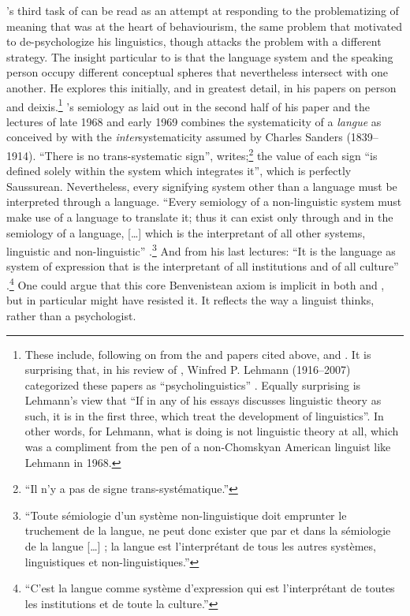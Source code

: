 \documentclass[output=paper]{langscibook}
\begin{document}
{\Benveniste}'s third task of \citeyear{Benveniste1954} can be read as an attempt at responding to the problematizing of meaning that was at the heart of behaviourism, the same problem that motivated {\Bloomfield} to de-psychologize his linguistics, though {\Benveniste} attacks the problem with a different strategy. The insight particular to {\Benveniste} is that the language system and the speaking person occupy different conceptual spheres that nevertheless intersect with one another. He explores this initially, and in greatest detail, in his papers on person and deixis.\footnote{These include, following on from the \citeyear{Benveniste1946} and \citeyear{Benveniste1949} papers cited above, \citet{Benveniste1956nature} and \citet{Benveniste1958}. It is surprising that, in his review of \citet{Benveniste1966}, Winfred P. Lehmann (1916--2007) categorized these papers as ``psycholinguistics'' \citep{Lehmann1968}. Equally surprising is Lehmann's view that ``If in any of his essays {\Benveniste} discusses linguistic theory as such, it is in the first three, which treat the development of linguistics''. In other words, for Lehmann, what {\Benveniste} is doing is not linguistic theory at all, which was a compliment from the pen of a non-Chomskyan American linguist like Lehmann in 1968.} {\Benveniste}'s semiology as laid out in the second half of his \citeyear{Benveniste1969semiologie} paper and the lectures of late 1968 and early 1969 combines the systematicity of a \emph{langue} as conceived by {\Saussure} with the \emph{inter}systematicity assumed by Charles Sanders {\Peirce} (1839--1914). ``There is no trans-systematic sign'', \citet[53]{Benveniste1969semiologie} writes;\footnote{``Il n'y a pas de signe trans-systématique.''} the value of each sign ``is defined solely within the system which integrates it'', which is perfectly Saussurean. Nevertheless, every signifying system other than a language must be interpreted through a language. ``Every semiology of a non-linguistic system must make use of a language to translate it; thus it can exist only through and in the semiology of a language, […] which is the interpretant of all other systems, linguistic and non-linguistic'' \citep[60]{Benveniste1969semiologie}.\footnote{``Toute sémiologie d'un système non-linguistique doit emprunter le truchement de la langue, ne peut donc exister que par et dans la sémiologie de la langue […] ; la langue est l'interprétant de tous les autres systèmes, linguistiques et non-linguistiques.''} And from his last lectures: ``It is the language as system of expression that is the interpretant of all institutions and of all culture'' \citep[83]{Benveniste2012}.\footnote{``C'est la langue comme système d’expression qui est l'interprétant de toutes les institutions et de toute la culture.''} One could argue that this core Benvenistean axiom is implicit in both {\Saussure} and {\Peirce}, but {\Peirce} in particular might have resisted it. It reflects the way a linguist thinks, rather than a psychologist.
\end{document}
